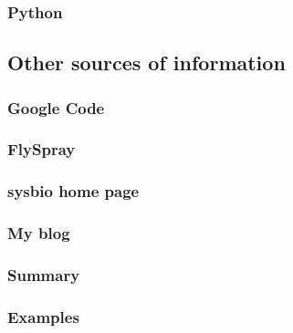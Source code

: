 \documentclass[12pt, letter, oneside]{book}
\begin{document}
\subsubsection{Python}
\subsection{Other sources of information}
\subsubsection{Google Code}
\subsubsection{FlySpray}
\subsubsection{sysbio home page}
\subsubsection{My blog}
\subsubsection{Summary}
\subsubsection{Examples}

\begin{appendix}
\appendix

\end{appendix}



\thispagestyle{empty}

\end{document}
